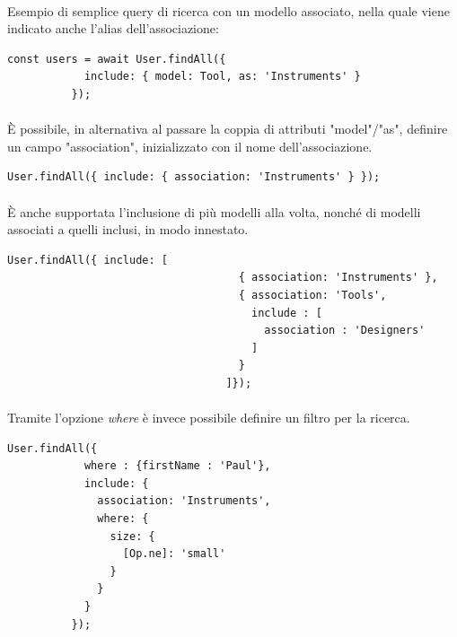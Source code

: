 \documentclass[a4paper, 12pt]{report}
\begin{document}
        \paragraph*{}
        Esempio di semplice query di ricerca con un modello associato, nella quale viene indicato anche l'alias dell'associazione:
        \begin{Verbatim}[samepage=true]
          const users = await User.findAll({
            include: { model: Tool, as: 'Instruments' }
          });
        \end{Verbatim}
        \paragraph*{}
        È possibile, in alternativa al passare la coppia di attributi "model"/"as", definire un campo "association", inizializzato con il nome dell'associazione.
        \begin{Verbatim}[samepage=true]
          User.findAll({ include: { association: 'Instruments' } });
        \end{Verbatim}
        \paragraph*{}
        È anche supportata l'inclusione di più modelli alla volta, nonché di modelli associati a quelli inclusi, in modo innestato.
        \begin{Verbatim}[samepage=true]
          User.findAll({ include: [
                                    { association: 'Instruments' }, 
                                    { association: 'Tools', 
                                      include : [
                                        association : 'Designers'
                                      ]
                                    }
                                  ]});
        \end{Verbatim}
        \paragraph*{}
        Tramite l'opzione \emph{where} è invece possibile definire un filtro per la ricerca.
        \begin{Verbatim}[samepage=true]
          User.findAll({
            where : {firstName : 'Paul'},
            include: {
              association: 'Instruments',
              where: {
                size: {
                  [Op.ne]: 'small'
                }
              }
            }
          });
        \end{Verbatim}
\end{document}
